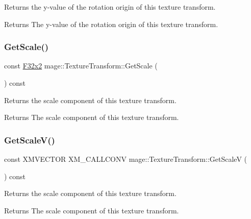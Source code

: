 Returns the y-\/value of the rotation origin of this texture transform.

\begin{DoxyReturn}{Returns}
The y-\/value of the rotation origin of this texture transform. 
\end{DoxyReturn}
\hypertarget{classmage_1_1_texture_transform_a822d0aac9ada61b2e8df0949b28fbff1}{}\label{classmage_1_1_texture_transform_a822d0aac9ada61b2e8df0949b28fbff1} 
\subsubsection{\texorpdfstring{Get\+Scale()}{GetScale()}}
{\footnotesize\ttfamily const \hyperlink{namespacemage_aa87237ad091f5cd7da612b8523fc108f}{F32x2} mage\+::\+Texture\+Transform\+::\+Get\+Scale (\begin{DoxyParamCaption}{ }\end{DoxyParamCaption}) const\hspace{0.3cm}{\ttfamily [noexcept]}}

Returns the scale component of this texture transform.

\begin{DoxyReturn}{Returns}
The scale component of this texture transform. 
\end{DoxyReturn}
\hypertarget{classmage_1_1_texture_transform_af8290a3e9db59677b9f2f217b464d625}{}\label{classmage_1_1_texture_transform_af8290a3e9db59677b9f2f217b464d625} 
\subsubsection{\texorpdfstring{Get\+Scale\+V()}{GetScaleV()}}
{\footnotesize\ttfamily const X\+M\+V\+E\+C\+T\+OR X\+M\+\_\+\+C\+A\+L\+L\+C\+O\+NV mage\+::\+Texture\+Transform\+::\+Get\+ScaleV (\begin{DoxyParamCaption}{ }\end{DoxyParamCaption}) const\hspace{0.3cm}{\ttfamily [noexcept]}}

Returns the scale component of this texture transform.

\begin{DoxyReturn}{Returns}
The scale component of this texture transform. 
\end{DoxyReturn}
\hypertarget{classmage_1_1_texture_transform_a8aba9997f667007fb9b77e14031a1f00}{}\label{classmage_1_1_texture_transform_a8aba9997f667007fb9b77e14031a1f00} 
